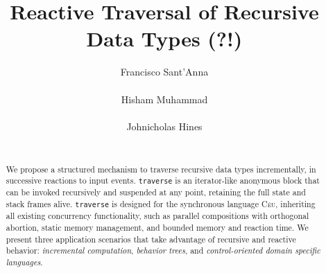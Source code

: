 \documentclass{acm_proc_article-sp}
\newcommand{\CEU}{\textsc{C\'{e}u}\xspace}
\newcommand{\code}[1] {{\small{\texttt{#1}}}}
\begin{document}
\title{Reactive Traversal of Recursive Data Types (?!)}

\author{
\alignauthor
Francisco Sant'Anna \\
     \\
\alignauthor
Hisham Muhammad \\
     \\
\alignauthor
Johnicholas Hines \\
     \\
}

\maketitle
\begin{abstract}
We propose a structured mechanism to traverse recursive data types 
incrementally, in successive reactions to input events.
\code{traverse} is an iterator-like anonymous block that can be invoked 
recursively and suspended at any point, retaining the full state and stack 
frames alive.
\code{traverse} is designed for the synchronous language \CEU, inheriting all 
existing concurrency functionality, such as parallel compositions with 
orthogonal abortion, static memory management, and bounded memory and reaction 
time.
We present three application scenarios that take advantage of recursive and 
reactive behavior: \emph{incremental computation}, \emph{behavior trees}, and 
\emph{control-oriented domain specific languages}.

\begin{comment}
MIX OF:
\begin{itemize}
    \item recursive calls to anonymous closures
    \item each instance---many co-routines
\end{itemize}

DESIGNED FOR \CEU:
\begin{itemize}
    \item lexical compositions
    \item static memory management
    \item bounded execution/memory
    \item reactive
    \item mutation
\end{itemize}
\end{comment}

\end{abstract}
\end{document}
